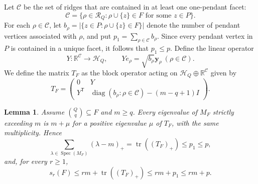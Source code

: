 \documentclass[11pt]{article}
\newtheorem{lemma}[theorem]{Lemma}
\newcommand{\R}{\mathbb{R}}
\newcommand{\tr}{\operatorname{tr}}
\newcommand{\Spec}{\operatorname{Spec}}
\newcommand{\diag}{\operatorname{diag}}
\newcommand{\calC}{\mathcal{C}}
\newcommand{\calR}{\mathcal{R}}
\newcommand{\scrH}{\mathscr{H}}
\begin{document}
Let \(\calC\) be the set of ridges that are contained in at least one
one-pendant facet:
\[
\calC=\{\rho\in\calR_Q:\rho\cup\{z\}\in F\text{ for some }z\in P\}.
\]
For each \(\rho\in\calC\), let \(b_\rho=|\{z\in P:\rho\cup\{z\}\in F\}|\) denote the
number of pendant vertices associated with \(\rho\), and put
\(p_1=\sum_{\rho\in\calC}b_\rho\). Since every pendant vertex in \(P\) is
contained in a unique facet, it follows that \(p_1\le p\). Define the linear
operator
$$
Y:\R^{\calC}\to\scrH_Q, \qquad Ye_\rho=\sqrt{b_\rho}\mathbf y_\rho\  (\rho\in\calC).
$$
We define the matrix \(T_F\) as the block operator acting on \(\scrH_Q\oplus\R^{\calC}\) given by
\begin{equation*}
	T_F=
	\begin{pmatrix}
		0 & Y \\
		Y^{\mathsf T} & \diag(b_\rho:\rho\in\calC)-(m-q+1)I
	\end{pmatrix}.
\end{equation*}

\begin{lemma}\label{lem:core-excess} Assume $\binom{Q}q\subseteq F$ and $m\ge q$. Every eigenvalue of $M_F$ strictly exceeding $m$ is $m+\mu$ for a positive eigenvalue $\mu$ of $T_F$, with the same multiplicity. Hence $$ \sum_{\lambda\in\Spec(M_F)}(\lambda-m)_+ =\tr((T_F)_+)\le p_1\le p, $$ and, for every $r\ge1$, $$ s_r(F) \le rm+\tr((T_F)_+) \le rm+p_1 \le rm+p. $$ \end{lemma}
\end{document}
